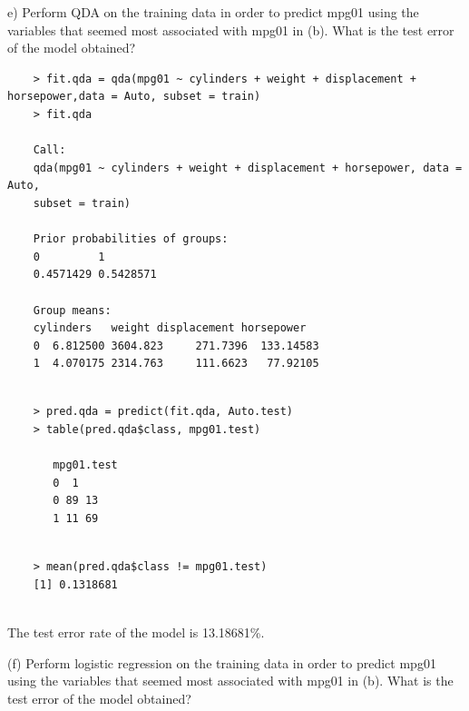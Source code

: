 \documentclass{article}
\begin{document}
\newpage
e) Perform QDA on the training data in order to predict mpg01 using the variables that seemed most associated with mpg01 in (b). What is the test error of the model obtained?

\begin{program}
	\begin{verbatim}	
	> fit.qda = qda(mpg01 ~ cylinders + weight + displacement + horsepower,data = Auto, subset = train)
	> fit.qda
	
	Call:
	qda(mpg01 ~ cylinders + weight + displacement + horsepower, data = Auto, 
	subset = train)
	
	Prior probabilities of groups:
	0         1 
	0.4571429 0.5428571 
	
	Group means:
	cylinders   weight displacement horsepower
	0  6.812500 3604.823     271.7396  133.14583
	1  4.070175 2314.763     111.6623   77.92105
		
	\end{verbatim}
\end{program}

\begin{program}
	\begin{verbatim}	
	> pred.qda = predict(fit.qda, Auto.test)
	> table(pred.qda$class, mpg01.test)
	
	   mpg01.test
	   0  1
	   0 89 13
	   1 11 69
	   	
	\end{verbatim}
\end{program}

\begin{program}
	\begin{verbatim}	
	> mean(pred.qda$class != mpg01.test)
	[1] 0.1318681
	
	\end{verbatim}
\end{program}
The test error rate of the model is 13.18681\%.




\newpage
(f) Perform logistic regression on the training data in order to predict mpg01 using the variables that seemed most associated with mpg01 in (b). What is the test error of the model obtained?
\end{document}
